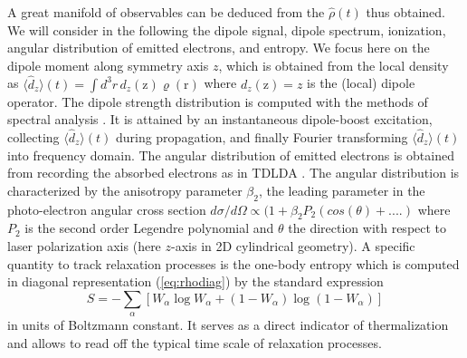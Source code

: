 \documentclass[final,1p]{elsarticle}
\begin{document}
A great manifold of observables can be deduced from the
$\hat{\rho}(t)$ thus obtained. We will consider in the following the
dipole signal, dipole spectrum, ionization, angular distribution of
emitted electrons, and entropy. We focus here on the dipole moment
along symmetry axis $z$, which is obtained from the local density as
$\langle\hat{d}_z\rangle(t)=\int{d}^3r\,d_z(\mathrm{z})\varrho(\mathrm{r})$
where $d_z(\mathrm{z})=z$ is the (local) dipole operator. The dipole
strength distribution is computed with the methods of spectral
analysis \cite{Cal97b}. It is attained by an instantaneous
dipole-boost excitation, collecting $\langle\hat{d}_z\rangle(t)$
during propagation, and finally Fourier transforming
$\langle\hat{d}_z\rangle(t)$ into frequency domain. The angular
  distribution of emitted electrons is obtained from recording the
absorbed electrons as in TDLDA \cite{Poh04b,Rei06aR}. The angular
distribution is characterized by the anisotropy parameter
$\beta_2$, the leading parameter in the photo-electron angular cross
section $d\sigma/d\Omega \propto (1+\beta_2 P_2(cos(\theta)+....)$
\cite{Wop10a,Wop10b} where $P_2$ is the second order Legendre
polynomial and $\theta$ the direction with respect to laser
polarization axis (here $z$-axis in 2D cylindrical geometry). A
specific quantity to track relaxation processes is the one-body
entropy which is computed in diagonal representation
(\ref{eq:rhodiag}) by the standard expression \cite{Rei98aB}
\begin{equation}
  S
  =
  - \sum_\alpha\left[
    W_\alpha\log W_\alpha
    +
    (1\!-\!W_\alpha)\log (1\!-\!W_\alpha)
  \right]
\label{eq:entropy}
\end{equation}
in units of Boltzmann constant. 
It serves as a direct indicator of thermalization and allows to 
read off the typical time scale of relaxation processes. 
\end{document}
